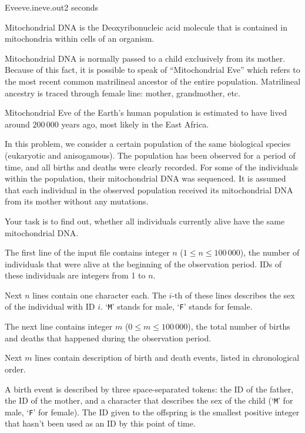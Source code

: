 \begin{problem}{Eve}{eve.in}{eve.out}{2 seconds}


Mitochondrial DNA %
is the Deoxyribonucleic acid molecule that is contained in mitochondria
within cells of an organism.

Mitochondrial DNA is normally passed to a child exclusively from its mother.
Because of this fact, it is possible to speak of ``Mitochondrial Eve'' which refers to
the most recent common matrilineal ancestor of the entire population. 
Matrilineal ancestry is traced through female line: mother, grandmother, etc.

Mitochondrial Eve of the Earth's human population is estimated to
have lived around $200\,000$ years ago, most likely in the East Africa.

In this problem, we consider a certain population of the same biological species (eukaryotic and anisogamous).
The population has been observed for a period of time, and all births and deaths
were clearly recorded.
For some of the individuals within the population, their mitochondrial DNA was sequenced. 
It is assumed that each individual in the observed population received its mitochondrial DNA
from its mother without any mutations.

Your task is to find out,
whether all individuals currently alive have the same mitochondrial DNA.

\InputFile

The first line of the input file contains integer $n$ ($1 \le n \le 100\,000$),
the number of individuals that were alive at the beginning of the observation period.
IDs of these individuals are integers from 1 to $n$.

Next $n$ lines contain one character each. The $i$-th of these lines describes
the sex of the individual with ID $i$. `\texttt{M}' stands for male, `\texttt{F}' stands for female.

The next line contains integer $m$ ($0 \le m \le 100\,000$), the total number of
births and deaths that happened during the observation period.

Next $m$ lines contain description of birth and death events, listed in
chronological order.

A birth event is described by three space-separated tokens: the ID of the father,
the ID of the mother, and a character that describes the sex of the child
(`\texttt{M}' for male, `\texttt{F}' for female).
The ID given to the offspring is the smallest positive integer that hasn't been used
as an ID by this point of time.


\end{problem}
